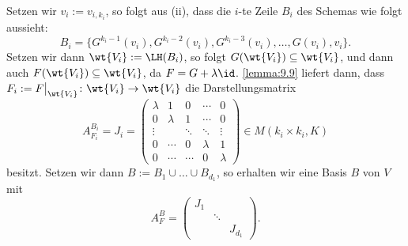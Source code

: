 \begin{beweis}
	Setzen wir $v_i := v_{i,k_i}$, so folgt aus (ii), dass die $i$-te Zeile $B_i$ des Schemas wie folgt aussieht:
	\[
		B_i = \{G^{k_i-1}(v_i), G^{k_i-2}(v_i), G^{k_i-3}(v_i),\dots,G(v_i),v_i\}.
	\]
	Setzen wir dann $\wt{V_i} := \LH(B_i)$, so folgt $G(\wt{V_i}) \subseteq \wt{V_i}$, und dann auch $F(\wt{V_i}) \subseteq \wt{V_i}$, da $F = G + \lambda \id$.
	\autoref{lemma:9.9} liefert dann, dass $F_i := F\big|_{\wt{V_i}} \colon \wt{V_i} \rightarrow \wt{V_i}$ die Darstellungsmatrix
	\[
		A_{F_i}^{B_i} = J_i = \begin{pmatrix}
		\lambda & 1 & 0 & \cdots & 0 \\ 
		0 & \lambda & 1 & \cdots & 0 \\ 
		\vdots &  & \ddots & \ddots & \vdots \\ 
		0 & \cdots & 0 & \lambda & 1 \\ 
		0 & \cdots & \cdots & 0 & \lambda
		\end{pmatrix} \in M(k_i \times k_i,K)
	\]
	besitzt.
	Setzen wir dann $B := B_1 \cup \dots \cup B_{d_1}$, so erhalten wir eine Basis $B$ von $V$ mit
	\[
	A_F^B = \begin{pmatrix}
	J_1 & & \\
	& \ddots & \\
	& & J_{d_1}
	\end{pmatrix}. 
	\]
\end{beweis}


